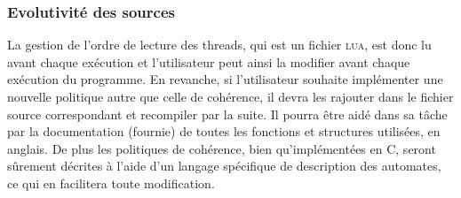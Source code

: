 \subsubsection{Evolutivité des sources}

La gestion de l'ordre de lecture des threads, qui est un fichier \textsc{lua}, est donc lu avant chaque exécution et l'utilisateur peut ainsi la modifier avant chaque exécution du programme. En revanche, si l'utilisateur souhaite implémenter une nouvelle politique autre que celle de cohérence, il devra les rajouter dans le fichier source correspondant et recompiler par la suite. Il pourra être aidé dans sa tâche par la documentation (fournie) de toutes les fonctions et structures utilisées, en anglais. De plus les politiques de cohérence, bien qu'implémentées en \textsc{C}, seront sûrement décrites à l'aide d'un langage spécifique de description des automates, ce qui en facilitera toute modification.
